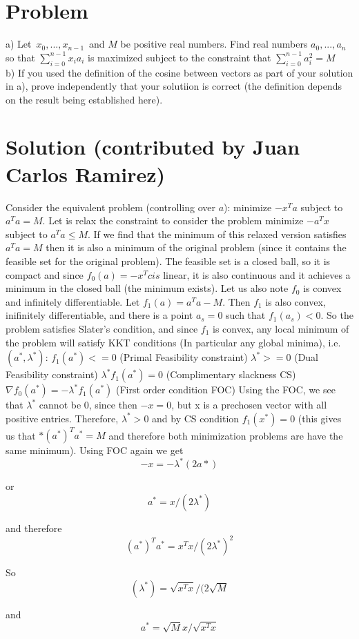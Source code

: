 \documentclass[11pt,a4paper]{report}
\theoremstyle{plain}
\theoremstyle{definition}
\theoremstyle{remark}
\begin{document}
\section*{Problem}
a)  Let $x_0 , ... , x_{n-1}$ and $M$ be positive real numbers.  Find real numbers $a_0, ..., a_n$ so that $\sum_{i = 0}^{n-1} x_i a_i$ is maximized subject to the constraint that $\sum_{i = 0}^{n-1} a_i ^2 = M$
\\
b) If you used the definition of the cosine between vectors as part of your solution in a), prove independently that your solutiion is correct (the definition depends on the result being established here).

\section*{Solution (contributed by Juan Carlos Ramirez)}
Consider the equivalent problem (controlling over $a$):
minimize $-x^Ta$
subject to $a^Ta=M$.
Let is relax the constraint to consider the problem
minimize $-a^Tx$
subject to $a^Ta \leq M$.
If we find that the minimum of this relaxed version satisfies $a^Ta=M$ then it is also a minimum of the original problem (since it contains the feasible set for the original problem). The feasible set is a closed ball, so it is compact and since $f_0(a)=-x^Tc is$  linear, it is also continuous and it achieves a minimum in the closed ball (the minimum exists). Let us also note $f_0$ is convex and infinitely differentiable.
Let $f_1(a) = a^Ta-M$. Then $f_1$ is also convex, inifinitely differentiable, and there is a point $a_s=0$ such that $f_1(a_s)<0$. So the problem satisfies Slater's condition, and since $f_1$ is convex, any local minimum of the problem will satisfy KKT conditions (In particular any global minima), i.e.  $(a^*,\lambda^*)$:
$f_1(a^*)<=0$ (Primal Feasibility constraint)
$\lambda^*>=0$ (Dual Feasibility constraint)
$\lambda^* f_1(a^*)=0$ (Complimentary slackness CS)
$\nabla f_0(a^*)= -\lambda^* f_1(a^*)$ (First order condition FOC)
Using the FOC, we see that $\lambda^*$ cannot be 0, since then $-x=0$, but x is a prechosen vector with all positive entries. Therefore, $\lambda^*>0$ and by CS condition $f_1(x^*)=0$ (this gives us that $*(a^*)^Ta^*=M$ and therefore both minimization problems are have the same minimum).
Using FOC again we get
$$ -x=-\lambda^*(2a*)$$

or
$$a^*=x/(2\lambda^*)$$

and therefore
$$(a^*)^Ta^*=x^Tx/(2\lambda^*)^2$$

So
$$(\lambda^*)=\sqrt{x^Tx}/(2\sqrt{M}$$

and
$$a^*=\sqrt{M}x/\sqrt{x^Tx}$$
\end{document}
